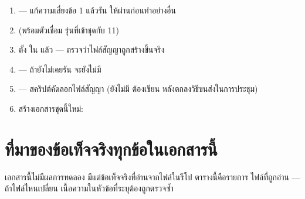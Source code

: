 \begin{enumerate}
\item {} --- แก้ความเสี่ยงข้อ 1
      แล้วรัน  ให้ผ่านก่อนทำอย่างอื่น
\item {} (พร้อมตัวเชื่อม 
      รุ่นที่เข้าชุดกับ  11)
\item ตั้ง  ใน 
      แล้ว  --- ตรวจว่าไฟล์สัญญาถูกสร้างขึ้นจริง
\item {} ---
      ถ้ายังไม่เคยรัน  จะยังไม่มี 
\item {} --- สคริปต์คัดลอกไฟล์สัญญา (ยังไม่มี ต้องเขียน
      หลังตกลงวิธีขนส่งในการประชุม)
\item สร้างเอกสารชุดนี้ใหม่: 
\end{enumerate}

\section{ที่มาของข้อเท็จจริงทุกข้อในเอกสารนี้}

เอกสารนี้ไม่มีผลการทดลอง มีแต่ข้อเท็จจริงที่อ่านจากไฟล์ในรีโป ตารางนี้คือรายการ
ไฟล์ที่ถูกอ่าน --- ถ้าไฟล์ไหนเปลี่ยน เนื้อความในหัวข้อที่ระบุต้องถูกตรวจซ้ำ

